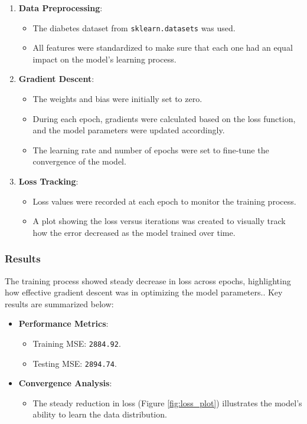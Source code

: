 \documentclass[12pt]{article}
\begin{document}
\begin{enumerate}
    \item \textbf{Data Preprocessing}:
    \begin{itemize}
        \item The diabetes dataset from \texttt{sklearn.datasets} was used.
        \item All features were standardized to make sure that each one had an equal impact on the model's learning process.
    \end{itemize}

    \item \textbf{Gradient Descent}:
    \begin{itemize}
        \item The weights and bias were initially set to zero.
        \item During each epoch, gradients were calculated based on the loss function, and the model parameters were updated accordingly.
        \item The learning rate and number of epochs were set to fine-tune the convergence of the model.
    \end{itemize}

    \item \textbf{Loss Tracking}:
    \begin{itemize}
        \item Loss values were recorded at each epoch to monitor the training process.
        \item A plot showing the loss versus iterations was created to visually track how the error decreased as the model trained over time.
    \end{itemize}
\end{enumerate}

\subsubsection{Results}

The training process showed steady decrease in loss across epochs, highlighting how effective gradient descent was in optimizing the model parameters.. Key results are summarized below:

\begin{itemize}
    \item \textbf{Performance Metrics}:
    \begin{itemize}
        \item Training MSE: \texttt{2884.92}.
        \item Testing MSE: \texttt{2894.74}.
    \end{itemize}
    \item \textbf{Convergence Analysis}:
    \begin{itemize}
        \item The steady reduction in loss (Figure \ref{fig:loss_plot}) illustrates the model's ability to learn the data distribution.
    \end{itemize}
\end{itemize}
\end{document}
